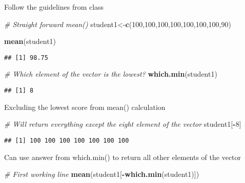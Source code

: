 \documentclass[
]{article}
\newenvironment{Shaded}{\begin{snugshade}}{\end{snugshade}}
\newcommand{\CommentTok}[1]{\textcolor[rgb]{0.56,0.35,0.01}{\textit{#1}}}
\newcommand{\DecValTok}[1]{\textcolor[rgb]{0.00,0.00,0.81}{#1}}
\newcommand{\FunctionTok}[1]{\textcolor[rgb]{0.13,0.29,0.53}{\textbf{#1}}}
\newcommand{\NormalTok}[1]{#1}
\newcommand{\OtherTok}[1]{\textcolor[rgb]{0.56,0.35,0.01}{#1}}
\newcommand{\SpecialCharTok}[1]{\textcolor[rgb]{0.81,0.36,0.00}{\textbf{#1}}}
\begin{document}
Follow the guidelines from class

\begin{Shaded}
\begin{Highlighting}[]
\CommentTok{\# Straight forward mean()}
\NormalTok{student1}\OtherTok{\textless{}{-}}\FunctionTok{c}\NormalTok{(}\DecValTok{100}\NormalTok{,}\DecValTok{100}\NormalTok{,}\DecValTok{100}\NormalTok{,}\DecValTok{100}\NormalTok{,}\DecValTok{100}\NormalTok{,}\DecValTok{100}\NormalTok{,}\DecValTok{100}\NormalTok{,}\DecValTok{90}\NormalTok{)}

\FunctionTok{mean}\NormalTok{(student1)}
\end{Highlighting}
\end{Shaded}

\begin{verbatim}
## [1] 98.75
\end{verbatim}

\begin{Shaded}
\begin{Highlighting}[]
\CommentTok{\# Which element of the vector is the lowest?}
\FunctionTok{which.min}\NormalTok{(student1)}
\end{Highlighting}
\end{Shaded}

\begin{verbatim}
## [1] 8
\end{verbatim}

Excluding the lowest score from mean() calculation

\begin{Shaded}
\begin{Highlighting}[]
\CommentTok{\# Will return everything except the eight element of the vector}
\NormalTok{student1[}\SpecialCharTok{{-}}\DecValTok{8}\NormalTok{]}
\end{Highlighting}
\end{Shaded}

\begin{verbatim}
## [1] 100 100 100 100 100 100 100
\end{verbatim}

Can use answer from which.min() to return all other elements of the
vector

\begin{Shaded}
\begin{Highlighting}[]
\CommentTok{\# First working line}
\FunctionTok{mean}\NormalTok{(student1[}\SpecialCharTok{{-}}\FunctionTok{which.min}\NormalTok{(student1)])}
\end{Highlighting}
\end{Shaded}
\end{document}
